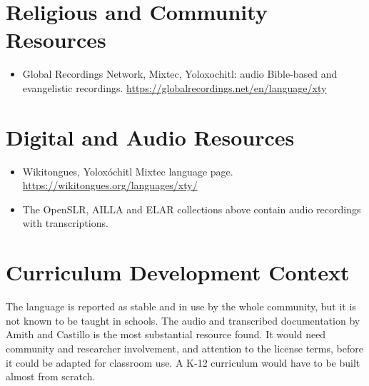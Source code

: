 \documentclass[12pt]{article}
\begin{document}
\section{Religious and Community Resources}
\begin{itemize}
\item Global Recordings Network, Mixtec, Yoloxochitl: audio Bible-based and evangelistic recordings. \url{https://globalrecordings.net/en/language/xty}
\end{itemize}

\section{Digital and Audio Resources}
\begin{itemize}
\item Wikitongues, Yoloxóchitl Mixtec language page. \url{https://wikitongues.org/languages/xty/}
\item The OpenSLR, AILLA and ELAR collections above contain audio recordings with transcriptions.
\end{itemize}

\section{Curriculum Development Context}
The language is reported as stable and in use by the whole community, but it is not known to be taught in schools. The audio and transcribed documentation by Amith and Castillo is the most substantial resource found. It would need community and researcher involvement, and attention to the license terms, before it could be adapted for classroom use. A K-12 curriculum would have to be built almost from scratch.
\end{document}
